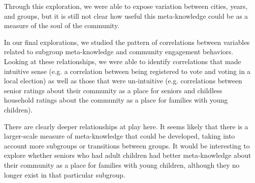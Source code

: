 \documentclass[smallextended]{svjour3}\usepackage[]{graphicx}\usepackage[]{color}
\begin{document}
Through this exploration, we were able to expose variation between cities, years, and groups, but it is still not clear how useful this meta-knowledge could be as a measure of the soul of the community. 

In our final explorations, we studied the pattern of correlations between variables related to subgroup meta-knowledge and community engagement behaviors. Looking at these relationships, we were able to identify correlations that made intuitive sense (e.g. a correlation between being registered to vote and voting in a local election) as well as those that were un-intuitive (e.g. correlations between senior ratings about their community as a place for seniors and childless household ratings about the community as a place for families with young children). 

There are clearly deeper relationships at play here. It seems likely that there is a larger-scale measure of meta-knowledge that could be developed, taking into account more subgroups or transitions between groups. It would be interesting to explore whether seniors who had adult children had better meta-knowledge about their community as a place for families with young children, although they no longer exist in that particular subgroup. 


\end{document}
